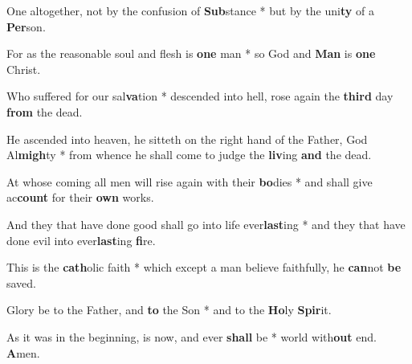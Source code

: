 \begin{multicols}{2}
	One altogether, not by the confusion of \textbf{Sub}stance * but by the uni\textbf{ty} of a \textbf{Per}son.
	
	For as the reasonable soul and flesh is \textbf{one} man * so God and \textbf{Man} is \textbf{one} Christ.
	
	Who suffered for our sal\textbf{va}tion * descended into hell, rose again the \textbf{third} day \textbf{from} the dead.
	
	He ascended into heaven, he sitteth on the right hand of the Father, God Al\textbf{migh}ty * from whence he shall come to judge the \textbf{liv}ing \textbf{and} the dead.
	
	At whose coming all men will rise again with their \textbf{bo}dies * and shall give ac\textbf{count} for their \textbf{own} works.
	
	And they that have done good shall go into life ever\textbf{last}ing * and they that have done evil into ever\textbf{last}ing \textbf{fi}re.
	
	This is the \textbf{cath}olic faith * which except a man believe faithfully, he \textbf{can}not \textbf{be} saved.
	
	Glory be to the Father, and \textbf{to} the Son * and to the \textbf{Ho}ly \textbf{Spir}it.
	
	As it was in the beginning, is now, and ever \textbf{shall} be * world with\textbf{out} end. \textbf{A}men.
\end{multicols}